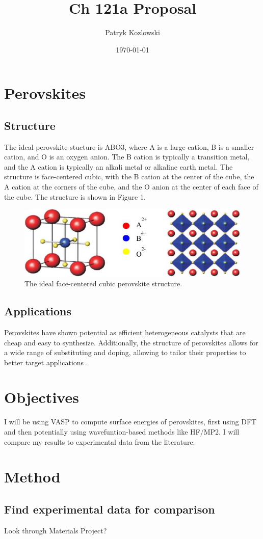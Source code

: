 \documentclass[12pt]{article}
\title{Ch 121a Proposal}
\author{Patryk Kozlowski}
\date{\today}
\begin{document}
\section{Perovskites}
\subsection{Structure}
The ideal perovskite stucture is ABO3, where A is a large cation, B is a smaller cation, and O is an oxygen anion. The B cation is typically a transition metal, and the A cation is typically an alkali metal or alkaline earth metal. The structure is face-centered cubic, with the B cation at the center of the cube, the A cation at the corners of the cube, and the O anion at the center of each face of the cube. The structure is shown in Figure 1.
\begin{figure}
\includegraphics[width=\linewidth]{perovskite.png}
\caption{The ideal face-centered cubic perovskite structure. \cite{assirey2019perovskite}}
\label{fig:perovskite}
\end{figure}
\subsection{Applications}
Perovskites have shown potential as efficient heterogeneous catalysts that are cheap and easy to synthesize. Additionally, the structure of perovskites allows for a wide range of substituting and doping, allowing to tailor their properties to better target applications \cite{royer2014perovskites}.
\section{Objectives}
I will be using VASP to compute surface energies of perovskites, first using DFT and then  potentially using wavefuntion-based methods like HF/MP2. I will compare my results to experimental data from the literature.
\section{Method}
\subsection{Find experimental data for comparison}
Look through Materials Project?
\end{document}
